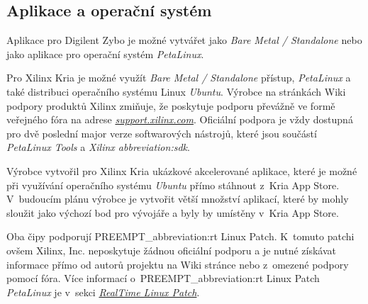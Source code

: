 \documentclass[a4paper, twoside, 11pt]{article}
\begin{document}
			\subsection{Aplikace a operační systém}\label{subsec:aplikace-a-operacni-system}
				Aplikace pro Digilent Zybo je možné vytvářet jako \textit{Bare Metal / Standalone} nebo jako aplikace pro operační systém \textit{PetaLinux}.\par
				Pro Xilinx Kria je možné využít \textit{Bare Metal / Standalone} přístup, \textit{PetaLinux} a také distribuci operačního systému Linux \textit{Ubuntu}. Výrobce na stránkách Wiki podpory produktů Xilinx zmiňuje, že poskytuje podporu převážně ve formě veřejného fóra na adrese \href{https://support.xilinx.com}{\textit{support.xilinx.com}}. Oficiální podpora je vždy dostupná pro dvě poslední major verze softwarových nástrojů, které jsou součástí \textit{PetaLinux Tools} a \textit{Xilinx \gls{abbreviation:sdk}}. \cite{xilinx-wiki-atlassian-embedded-sw-support}\par
				Výrobce vytvořil pro Xilinx Kria ukázkové akcelerované aplikace, které je možné při využívání operačního systému \textit{Ubuntu} přímo stáhnout z~Kria App Store. V~budoucím plánu výrobce je vytvořit větší množství aplikací, které by mohly sloužit jako výchozí bod pro vývojáře a byly by umístěny v~Kria App Store. \cite{xilinx-appstore-for-kria-soms}\par
				Oba čipy podporují PREEMPT\_\gls{abbreviation:rt} Linux Patch. K~tomuto patchi ovšem Xilinx, Inc. neposkytuje žádnou oficiální podporu a je nutné získávat informace přímo od autorů projektu na Wiki stránce \cite{wiki-linux-foundation-real-time-linux} nebo z~omezené podpory pomocí fóra. Více informací o~PREEMPT\_\gls{abbreviation:rt} Linux Patch \textit{PetaLinux} je v~sekci \hyperref[subsec:real-time-linux-patch]{\textit{RealTime Linux Patch}}.
\end{document}
